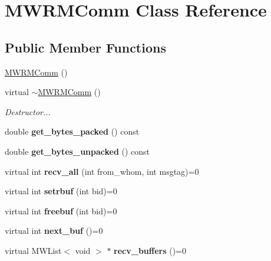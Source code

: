 \hypertarget{classMWRMComm}{}\section{M\+W\+R\+M\+Comm Class Reference}
\label{classMWRMComm}
\subsection*{Public Member Functions}
\begin{DoxyCompactItemize}
\item 
\hyperlink{classMWRMComm_a94ada3d2aa96190bf5444dfc64dd7147}{M\+W\+R\+M\+Comm} ()
\item 
\mbox{\label{classMWRMComm_a88c434d97ad8a782d22497719d2ebc64}} 
virtual \hyperlink{classMWRMComm_a88c434d97ad8a782d22497719d2ebc64}{$\sim$\+M\+W\+R\+M\+Comm} ()
\begin{DoxyCompactList}\small\item\em Destructor... \end{DoxyCompactList}\item 
\mbox{\label{classMWRMComm_a2eb445f774968a712a8f966dc1e09f40}} 
double {\bfseries get\+\_\+bytes\+\_\+packed} () const
\item 
\mbox{\label{classMWRMComm_aa3573b54682780279675f833417cc16d}} 
double {\bfseries get\+\_\+bytes\+\_\+unpacked} () const
\item 
\mbox{\label{classMWRMComm_a9032f22c8dfd857af4a26fa69f19e024}} 
virtual int {\bfseries recv\+\_\+all} (int from\+\_\+whom, int msgtag)=0
\item 
\mbox{\label{classMWRMComm_ad802e30a8f9304241cd60d39bdceae73}} 
virtual int {\bfseries setrbuf} (int bid)=0
\item 
\mbox{\label{classMWRMComm_ad0019f50d9f820af6160e4c19055f803}} 
virtual int {\bfseries freebuf} (int bid)=0
\item 
\mbox{\label{classMWRMComm_afe97af8616485b9e8aca183fbca3417b}} 
virtual int {\bfseries next\+\_\+buf} ()=0
\item 
\mbox{\label{classMWRMComm_ad8cbe06f00312db9397a04394b931130}} 
virtual M\+W\+List$<$ void $>$ $\ast$ {\bfseries recv\+\_\+buffers} ()=0
\end{DoxyCompactItemize}
